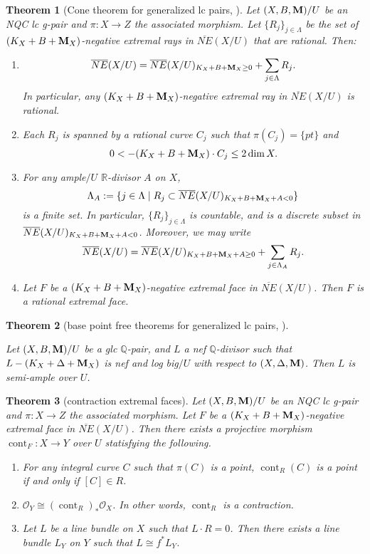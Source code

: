 \documentclass[11pt]{amsart}
\numberwithin{equation}{section}
\newcommand{\Mm}{{\bf{M}}}
\newcommand{\Qq}{\mathbb{Q}}
\newcommand{\Rr}{\mathbb{R}}
\newcommand{\cont}{\operatorname{cont}}
\newtheorem{thm}{Theorem}[section]
\theoremstyle{definition}
\theoremstyle{definition}
\theoremstyle{definition}
\begin{document}
\begin{thm}[Cone theorem for generalized lc pairs, {\cite[Theorem 5.1]{HL21}}]\label{thm: cone glc pair}
Let $(X,B,\Mm)/U$ be an NQC lc g-pair and $\pi: X\rightarrow Z$ the associated morphism. Let $\{R_j\}_{j\in\Lambda}$ be the set of $(K_X+B+\Mm_X)$-negative extremal rays in $\overline{NE}(X/U)$ that are rational. Then:
\begin{enumerate}
    \item $$\overline{NE}(X/U)=\overline{NE}(X/U)_{K_X+B+\Mm_X\geq 0}+\sum_{j\in\Lambda} R_j.$$
    In particular, any $(K_X+B+\Mm_X)$-negative extremal ray in $\overline{NE}(X/U)$ is rational.
    \item Each $R_j$ is spanned by a rational curve $C_j$ such that $\pi(C_j)=\{pt\}$ and 
    $$0<-(K_X+B+\Mm_X)\cdot C_j\leq 2\dim X.$$
    \item For any ample$/U$ $\Rr$-divisor $A$ on $X$,
    $$\Lambda_A:=\{j\in\Lambda\mid R_j\subset\overline{NE}(X/U)_{K_X+B+\Mm_X+A<0}\}$$
    is a finite set. In particular, $\{R_j\}_{j\in\Lambda}$ is countable, and is a discrete subset in $\overline{NE}(X/U)_{K_X+B+\Mm_X+A<0}$. Moreover, we may write
    $$\overline{NE}(X/U)=\overline{NE}(X/U)_{K_X+B+\Mm_X+A\geq 0}+\sum_{j\in\Lambda_A}R_j.$$
  \item Let $F$ be a $(K_{X}+B+\Mm_{X})$-negative extremal face in $\overline{NE}(X/U)$. Then $F$ is a rational extremal face. 
\end{enumerate}
\end{thm}

\begin{thm}[base point free theorems for generalized lc pairs, {\cite[Theorem 1.1]{Xie22}} ]\label{thm: base point free theorem}
  
Let $(X,B,\Mm)/U$ be a glc $\mathbb{Q}$-pair, and $L$ a nef $\Qq$-divisor such that $L-(K_X+\Delta+\Mm_X)$ is nef and log big$/U$ with respect to $(X,\Delta,\Mm)$. Then $L$ is semi-ample over $U$. 
\end{thm}

\begin{thm}[contraction extremal faces]\label{thm: contraction extremal face glc}
Let $(X,B,\Mm)/U$ be an NQC lc g-pair and $\pi: X\rightarrow Z$ the associated morphism. Let $F$ be a $(K_{X}+B+\Mm_{X})$-negative extremal face in $ \overline{NE}(X/U)$. Then there exists a projective morphism $\cont_F: X \rightarrow Y$ over $U$ statisfying the following.
\begin{enumerate}
        \item For any integral curve $C$ such that $\pi(C)$ is a point, $\cont_R(C)$ is a point if and only if $[C]\in R$.
        \item $\mathcal{O}_Y\cong(\cont_R)_*\mathcal{O}_X$. In other words, $\cont_R$ is a contraction.
        \item Let $L$ be a line bundle on $X$ such that $L\cdot R=0$. Then there exists a line bundle $L_Y$ on $Y$ such that $L\cong f^*L_Y$.
    \end{enumerate}
\end{thm}
\end{document}

